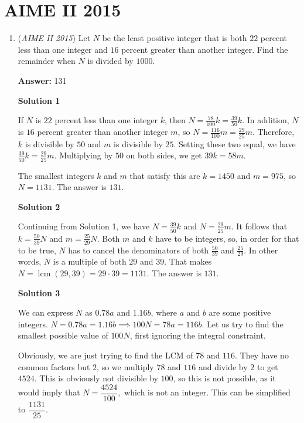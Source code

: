 \section{AIME II 2015}
        \begin{enumerate}
        	\item (\textit{AIME II 2015}) Let $N$ be the least positive integer that is both $22$ percent less than one integer and $16$ percent greater than another integer. Find the remainder when $N$ is divided by $1000$.


 
 \textbf{Answer: }131



\textbf{Solution 1}

If $N$ is $22$ percent less than one integer $k$, then $N=\frac{78}{100}k=\frac{39}{50}k$. In addition, $N$ is $16$ percent greater than another integer $m$, so $N=\frac{116}{100}m=\frac{29}{25}m$. Therefore, $k$ is divisible by $50$ and $m$ is divisible by $25$. Setting these two equal, we have $\frac{39}{50}k=\frac{29}{25}m$. Multiplying by $50$ on both sides, we get $39k=58m$.

 The smallest integers $k$ and $m$ that satisfy this are $k=1450$ and $m=975$, so $N=1131$. The answer is $\boxed{131}$.

 



\textbf{Solution 2}

Continuing from Solution 1, we have $N=\frac{39}{50}k$ and $N=\frac{29}{25}m$. It follows that $k=\frac{50}{39}N$ and $m=\frac{25}{29}N$. Both $m$ and $k$ have to be integers, so, in order for that to be true, $N$ has to cancel the denominators of both $\frac{50}{39}$ and $\frac{25}{29}$. In other words, $N$ is a multiple of both $29$ and $39$. That makes $N=\operatorname{lcm}(29,39)=29\cdot39=1131$. The answer is $\boxed{131}$.

 



\textbf{Solution 3}

We can express $N$ as $0.78a$ and $1.16b$, where $a$ and $b$ are some positive integers. $N=0.78a=1.16b\implies100N=78a=116b.$ Let us try to find the smallest possible value of $100N$, first ignoring the integral constraint. 

 Obviously, we are just trying to find the LCM of $78$ and $116.$ They have no common factors but $2$, so we multiply $78$ and $116$ and divide by $2$ to get $4524.$ This is obviously not divisible by $100$, so this is not possible, as it would imply that $N=\dfrac{4524}{100},$ which is not an integer. This can be simplified to $\dfrac{1131}{25}$. 


\end{enumerate}
